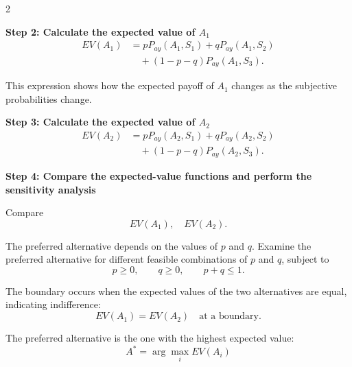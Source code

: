 	\noindent
	\setlength{\columnseprule}{0.4pt}
	
	\begin{multicols}{2}
		\vspace{0pt}
		
		\textbf{Step 2: Calculate the expected value of $A_1$}
		\[
		\begin{aligned}
			EV(A_1)
			&=pP_{ay}(A_1,S_1)
			+qP_{ay}(A_1,S_2)\\
			&\quad +(1-p-q)P_{ay}(A_1,S_3).
		\end{aligned}
		\]
		
		This expression shows how the expected payoff of $A_1$ changes
		as the subjective probabilities change.
		
		\columnbreak
		
		\textbf{Step 3: Calculate the expected value of $A_2$}
		\[
		\begin{aligned}
			EV(A_2)
			&=pP_{ay}(A_2,S_1)
			+qP_{ay}(A_2,S_2)\\
			&\quad +(1-p-q)P_{ay}(A_2,S_3).
		\end{aligned}
		\]
		
	\end{multicols}
	
	\setlength{\columnseprule}{0pt}
	
	\textbf{Step 4: Compare the expected-value functions and perform the sensitivity analysis}
	
	Compare
	$$
	EV(A_1),\quad
	EV(A_2).
	$$
	
	The preferred alternative depends on the values of $p$ and $q$. Examine
	the preferred alternative for different feasible combinations of $p$ and
	$q$, subject to
	$$
	p\geq0,\qquad q\geq0,\qquad p+q\leq1.
	$$
	
	The boundary occurs when the expected values of the two alternatives
	are equal, indicating indifference:
	$$
	EV(A_1)=EV(A_2)
	\quad\text{at a boundary}.
	$$
	
	The preferred alternative is the one with the highest expected value:
	$$
	A^*=\arg\max_{i}EV(A_i)
	$$ \vspace{-10mm}

